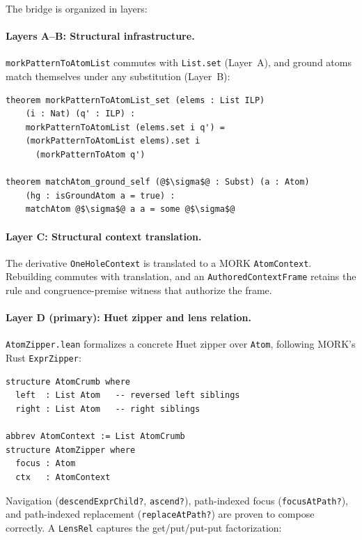 \documentclass[11pt]{article}
\theoremstyle{definition}
\theoremstyle{remark}
\newcommand{\MORK}{\textup{MORK}}
\begin{document}
The bridge is organized in layers:

\paragraph{Layers A--B: Structural infrastructure.}
\texttt{morkPatternToAtomList} commutes with \texttt{List.set} (Layer~A),
and ground atoms match themselves under any substitution (Layer~B):

\begin{lstlisting}
theorem morkPatternToAtomList_set (elems : List ILP)
    (i : Nat) (q' : ILP) :
    morkPatternToAtomList (elems.set i q') =
    (morkPatternToAtomList elems).set i
      (morkPatternToAtom q')

theorem matchAtom_ground_self (@$\sigma$@ : Subst) (a : Atom)
    (hg : isGroundAtom a = true) :
    matchAtom @$\sigma$@ a a = some @$\sigma$@
\end{lstlisting}

\paragraph{Layer C: Structural context translation.}
The derivative \texttt{OneHoleContext} is translated to a \MORK{}
\texttt{AtomContext}.  Rebuilding commutes with translation, and an
\texttt{AuthoredContextFrame} retains the rule and congruence-premise witness
that authorize the frame.

\paragraph{Layer D (primary): Huet zipper and lens relation.}
\texttt{AtomZipper.lean} formalizes a concrete Huet zipper over
\texttt{Atom}, following \MORK{}'s Rust \texttt{ExprZipper}:

\begin{lstlisting}
structure AtomCrumb where
  left  : List Atom   -- reversed left siblings
  right : List Atom   -- right siblings

abbrev AtomContext := List AtomCrumb
structure AtomZipper where
  focus : Atom
  ctx   : AtomContext
\end{lstlisting}

\noindent
Navigation (\texttt{descendExprChild?}, \texttt{ascend?}),
path-indexed focus (\texttt{focusAtPath?}), and
path-indexed replacement (\texttt{replaceAtPath?}) are proven
to compose correctly.  A \texttt{LensRel} captures the
get/put/put-put factorization:
\end{document}

